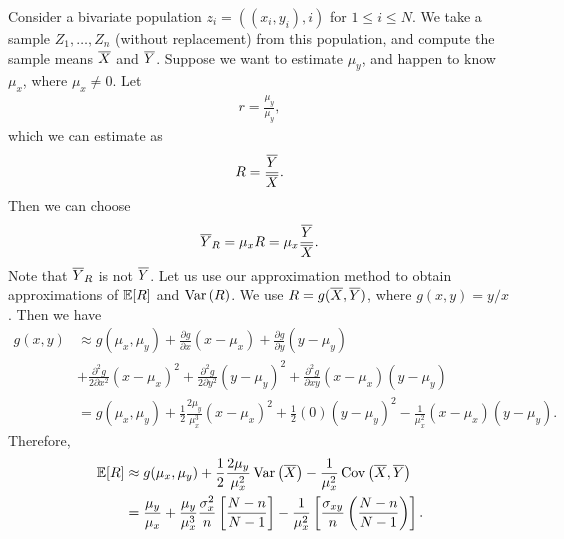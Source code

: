 \begin{exmp}
    Consider a bivariate population $z_i = ((x_i, y_i), i)$ for $1 \leq i \leq N$. We take a sample $Z_1, \ldots, Z_n$ (without replacement) from this population, and compute the sample means $\overline{X}$ and $\overline{Y}$. Suppose we want to estimate $\mu_y$, and happen to know $\mu_x$, where $\mu_x \neq 0$. Let
    \begin{align*}
        r = \frac{\mu_y}{\mu_y},
    \end{align*}
    which we can estimate as
    \begin{align*}
        R = \frac{\overline{Y}}{\overline{X}}.
    \end{align*}
    Then we can choose
    \begin{align*}
        \overline{Y}_R = \mu_xR = \mu_x\frac{\overline{Y}}{\overline{X}}.
    \end{align*}
    Note that $\overline{Y}_R$ is not $\overline{Y}$. Let us use our approximation method to obtain approximations of $\operatorname{\mathbb{E}}\!\left[{R}\right]$ and $\operatorname{Var}\left(R\right)$. We use $R = g(\overline{X}, \overline{Y})$, where $g(x, y) = y/x$. Then we have
    \begin{align*}
        g(x, y) &\approx g(\mu_x, \mu_y) + \frac{\partial g}{\partial x}(x - \mu_x) + \frac{\partial g}{\partial y}(y - \mu_y) \\
        &+ \frac{\partial^2g}{2\partial x^2}(x - \mu_x)^2 + \frac{\partial^2g}{2\partial y^2}(y - \mu_y)^2 + \frac{\partial^2g}{\partial xy}(x - \mu_x)(y - \mu_y) \\
        &= g(\mu_x, \mu_y) + \frac{1}{2}\frac{2\mu_y}{\mu_x^3}(x-\mu_x)^2 + \frac{1}{2}(0)(y-\mu_y)^2 - \frac{1}{\mu_x^2}(x-\mu_x)(y-\mu_y).
    \end{align*}
    Therefore,
    \begin{align*}
        \operatorname{\mathbb{E}}\!\left[{R}\right] &\approx g(\mu_x, \mu_y) + \frac{1}{2}\frac{2\mu_y}{\mu_x^2}\operatorname{Var}\left(\overline{X}\right) - \frac{1}{\mu_x^2}\operatorname{Cov}\left(\overline{X}, \overline{Y}\right) \\
        &= \frac{\mu_y}{\mu_x} + \frac{\mu_y}{\mu_x^3}\frac{\sigma_x^2}{n}\left[\frac{N-n}{N-1}\right] - \frac{1}{\mu_x^2}\left[\frac{\sigma_{xy}}{n}\left(\frac{N-n}{N-1}\right)\right].
    \end{align*}


\end{exmp}
